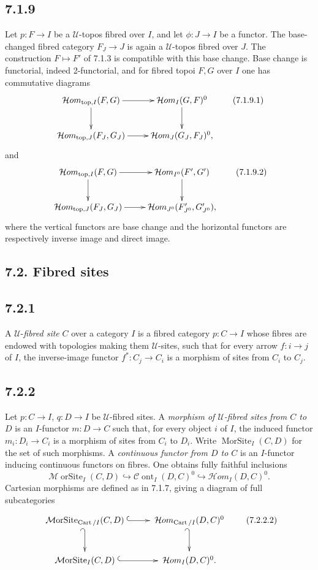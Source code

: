 \documentclass[11pt]{article}
\newcommand{\U}{\mathcal{U}}
\newcommand{\Cart}{\operatorname{Cart}}
\newcommand{\Morsite}{\operatorname{MorSite}}
\newcommand{\Mmorsite}{\mathcal{M}\!\operatorname{orSite}}
\newcommand{\Ccont}{\mathcal{C}\!\operatorname{ont}}
\begin{document}
\subsection*{7.1.9}
Let \(p:F\to I\) be a \(\U\)-topos fibred over \(I\), and let \(\phi:J\to I\) be a functor. The base-changed fibred category \(F_J\to J\) is again a \(\U\)-topos fibred over \(J\). The construction \(F\mapsto F'\) of 7.1.3 is compatible with this base change. Base change is functorial, indeed 2-functorial, and for fibred topoi \(F,G\) over \(I\) one has commutative diagrams
\[
\xymatrix{
\mathcal{H}om_{\mathrm{top},I}(F,G)\ar[r]\ar[d]&\mathcal{H}om_I(G,F)^0\ar[d]\\
\mathcal{H}om_{\mathrm{top},J}(F_J,G_J)\ar[r]&\mathcal{H}om_J(G_J,F_J)^0,
}\tag{7.1.9.1}
\]
and
\[
\xymatrix{
\mathcal{H}om_{\mathrm{top},I}(F,G)\ar[r]\ar[d]&\mathcal{H}om_{I^0}(F',G')\ar[d]\\
\mathcal{H}om_{\mathrm{top},J}(F_J,G_J)\ar[r]&\mathcal{H}om_{J^0}(F'_{J^0},G'_{J^0}),
}\tag{7.1.9.2}
\]
where the vertical functors are base change and the horizontal functors are respectively inverse image and direct image.

\subsection*{7.2. Fibred sites}

\subsection*{7.2.1}
A \(\U\)-\emph{fibred site} \(C\) over a category \(I\) is a fibred category \(p:C\to I\) whose fibres are endowed with topologies making them \(\U\)-sites, such that for every arrow \(f:i\to j\) of \(I\), the inverse-image functor \(f^*:C_j\to C_i\) is a morphism of sites from \(C_i\) to \(C_j\).

\subsection*{7.2.2}
Let \(p:C\to I\), \(q:D\to I\) be \(\U\)-fibred sites. A \emph{morphism of \(\U\)-fibred sites from \(C\) to \(D\)} is an \(I\)-functor \(m:D\to C\) such that, for every object \(i\) of \(I\), the induced functor \(m_i:D_i\to C_i\) is a morphism of sites from \(C_i\) to \(D_i\). Write \(\Morsite_I(C,D)\) for the set of such morphisms. A \emph{continuous functor from \(D\) to \(C\)} is an \(I\)-functor inducing continuous functors on fibres. One obtains fully faithful inclusions
\[
\Mmorsite_I(C,D)\hookrightarrow\Ccont_I(D,C)^0\hookrightarrow\mathcal{H}om_I(D,C)^0. \tag{7.2.2.1}
\]
Cartesian morphisms are defined as in 7.1.7, giving a diagram of full subcategories
\[
\xymatrix@M=.2cm{
\Mmorsite_{\Cart/I}(C,D)\ar@{^{(}->}[r]\ar@{_{(}->}[d]&\mathcal{H}om_{\Cart/I}(D,C)^0\ar@{_{(}->}[d]\\
\Mmorsite_I(C,D)\ar@{^{(}->}[r]&\mathcal{H}om_I(D,C)^0.
}\tag{7.2.2.2}
\]
\end{document}
